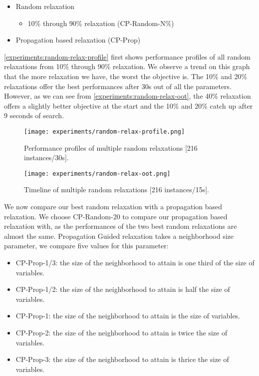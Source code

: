 \documentclass[../../thesis.tex]{subfiles}
\begin{document}
\begin{itemize}
  \item Random relaxation 
    \begin{itemize}
      \item 10\% through 90\% relaxation (CP-Random-N\%)
    \end{itemize}
  \item Propagation based relaxation (CP-Prop)
\end{itemize}

\autoref{experiments:random-relax-profile} first shows performance profiles of all random relaxations 
from 10\% through 90\% relaxation. We observe a trend on this graph that the more relaxation we have,
the worst the objective is. The 10\% and 20\% relaxations offer the best performances after 30s out of all 
the parameters. However, as we can see from \autoref{experiments:random-relax-oot}, the 40\% relaxation 
offers a slightly better objective at the start and the 10\% and 20\% catch up after 9 seconds of search.



\begin{figure}
  \centering
  \texttt{[image: experiments/random-relax-profile.png]}
  \caption{Performance profiles of multiple random relaxations [216 instances/30s].}
  \label{experiments:random-relax-profile}
\end{figure}

\begin{figure}
  \centering
  \texttt{[image: experiments/random-relax-oot.png]}
  \caption{Timeline of multiple random relaxations [216 instances/15s].}
  \label{experiments:random-relax-oot}
\end{figure}


We now compare our best random relaxation with a propagation based relaxation.
We choose CP-Random-20 to compare our propagation based relaxation with, as the performances of 
the two best random relaxations are almost the same.
Propagation Guided relaxation takes a neighborhood size parameter, we compare five values for this parameter:

\begin{itemize}
  \item CP-Prop-1/3: the size of the neighborhood to attain is one third of the size of variables.
  \item CP-Prop-1/2: the size of the neighborhood to attain is half the size of variables.
  \item CP-Prop-1: the size of the neighborhood to attain is the size of variables.
  \item CP-Prop-2: the size of the neighborhood to attain is twice the size of variables.
  \item CP-Prop-3: the size of the neighborhood to attain is thrice the size of variables.
\end{itemize}
\end{document}
